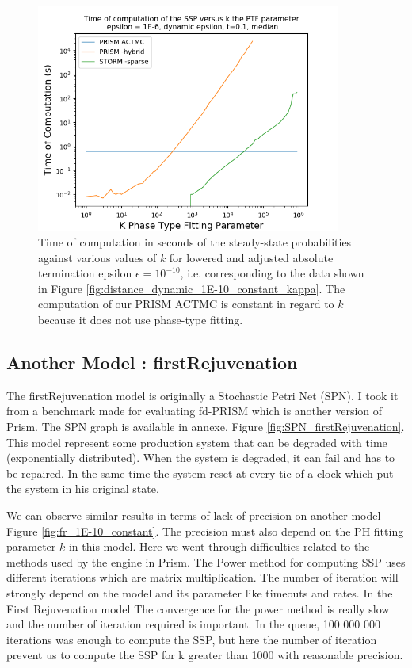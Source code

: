 \documentclass[runningheads,custombib]{llncs}
\begin{document}
	\begin{figure}
		\begin{center}
			\includegraphics[trim=0.2cm 0cm 0cm 1.35cm,width=10cm, clip]{../picture/New_model/1E-6/performance_dynamic.png}
		\end{center}
		\caption{Time of computation in seconds of the steady-state probabilities against various values of $k$ for lowered and adjusted absolute termination epsilon $\epsilon = 10^{-10}$, i.e. corresponding to the data shown in Figure \ref{fig:distance_dynamic_1E-10_constant_kappa}. The computation of our PRISM ACTMC is constant in regard to $k$ because it does not use phase-type fitting. }
		\label{fig:performance_dynamic}
	\end{figure}
	
	\subsection{Another Model : firstRejuvenation}
	The firstRejuvenation model \cite{German:2000:PAC:518204} is originally a Stochastic Petri Net (SPN). I took it from a benchmark \cite{benchmark} made for evaluating fd-PRISM which is another version of Prism. The SPN graph is available in annexe, Figure \ref{fig:SPN_firstRejuvenation}. This model represent some production system that can be degraded with time (exponentially distributed). When the system is degraded, it can fail and has to be repaired. In the same time the system reset at every tic of a clock which put the system in his original state. 
	
	We can observe similar results in terms of lack of precision on another model Figure \ref{fig:fr_1E-10_constant}. The precision must also depend on the PH fitting parameter $k$ in this model. Here we went through difficulties related to the methods used by the engine in Prism. The Power method for computing SSP uses different iterations which are matrix multiplication. The number of iteration will strongly depend on the model and its parameter like timeouts and rates. In the First Rejuvenation model The convergence for the power method is really slow and the number of iteration required is important. In the queue, 100 000 000 iterations was enough to compute the SSP, but here the number of iteration prevent us to compute the SSP for k greater than 1000 with reasonable precision.
	
\end{document}
